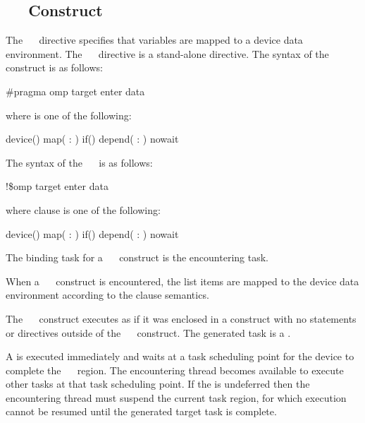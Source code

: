 \subsection{~~ Construct}
\label{subsec:target enter data Construct}
\summary
The ~~ directive specifies that variables are mapped to a device data environment. The ~~ directive is a stand-alone directive.
\syntax
\ccppspecificstart
The syntax of the ~~ construct is as follows:
\begin{boxedcode}
\#pragma omp target enter data 
\end{boxedcode}
where  is one of the following:
\begin{indentedcodelist}
device()
map(\plc{[ [map-type-modifier[,]] map-type} : \plc{] list})
if()
depend( : )
nowait
\end{indentedcodelist}
\ccppspecificend
\fortranspecificstart
The syntax of the ~~ is as follows:
\begin{boxedcode}
!\$omp target enter data 
\end{boxedcode}
where clause is one of the following:
\begin{indentedcodelist}
device()
map(\plc{[ [map-type-modifier[,]] map-type} : \plc{] list})
if()
depend( : )
nowait
\end{indentedcodelist}
\fortranspecificend

\binding
The binding task for a ~~ construct is the encountering task. 

\descr
When a ~~ construct is encountered, the list items are mapped to the device data environment according to the  clause semantics.

The ~~ construct executes as if it was enclosed in a  construct with no statements or directives outside of the ~~ construct. The generated task is a .

A  is executed immediately and waits at a task scheduling point for the device to complete the ~~ region. The encountering thread becomes available to execute other tasks at that task scheduling point. If the  is undeferred then the encountering thread must suspend the current task region, for which execution cannot be resumed until the generated target task is complete.

